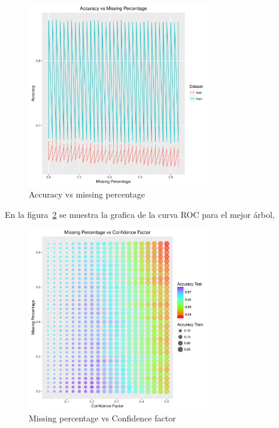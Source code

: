 \begin{figure}
  \centering
  \includegraphics[width = 8cm]{4c.pdf}
  \caption{Accuracy vs missing percentage}
  \label{fig:4c}
\end{figure}

En la figura~\ref{fig:4d} se muestra la grafica de la curva ROC para el mejor árbol,

\begin{figure}
  \centering
  \includegraphics[width = 8cm]{4d.pdf}
  \caption{Missing percentage vs Confidence factor}
  \label{fig:4d}
\end{figure}

